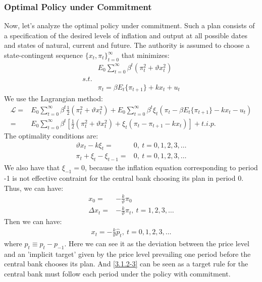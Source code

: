 \documentclass{article}
\numberwithin{equation}{section}
\begin{document}
\subsubsection{Optimal Policy under Commitment}
Now, let's analyze the optimal policy under commitment. Such a plan consists of a specification of the desired levels of inflation and output at all possible dates and states of natural, current and future. The authority is assumed to choose a state-contingent sequence $\{ x_t, \pi_t \}^\infty_{t=0}$ that minimizes:
	\begin{align*}
		&E_0 \sum\limits^\infty_{t=0} \beta^t(\pi^2_t + \vartheta x^2_t)\\
		s.t.&\\
		&\pi_t = \beta E_t\{ \pi_{t+1} \} + kx_t + u_t
	\end{align*}
We use the Lagrangian method:
	\begin{align*}
		\mathscr{L} = &E_0 \sum\limits^\infty_{t=0} \beta^t \frac{1}{2} (\pi^2_t + \vartheta x^2_t) +  E_0 \sum\limits^\infty_{t=0} \beta^t \xi_t (\pi_t - \beta E_t\{ \pi_{t+1} \} - kx_t - u_t)\\
		= &E_0 \sum\limits^\infty_{t=0} \beta^t \left[ \frac{1}{2} (\pi^2_t + \vartheta x^2_t) + \xi_t (\pi_t - \pi_{t+1} - kx_t) \right] + t.i.p.
	\end{align*}
The optimality conditions are:
	\begin{align*}
		\vartheta x_t - k\xi_t = &0,\ t = 0, 1, 2, 3, \ldots\\
		\pi_t + \xi_t - \xi_{t-1} = &0,\ t = 0, 1, 2, 3, \ldots
	\end{align*}
We also have that $	\xi_{-1} = 0$, because the inflation equation corresponding to period -1 is not effective contraint for the central bank choosing its plan in period 0.\\
Thus, we can have:
	\begin{align}
		x_0 = &-\frac{k}{\vartheta}\pi_0 \label{3.1.2-1}\\
		\Delta x_t = &-\frac{k}{\vartheta}\pi_t,\ t = 1, 2, 3, \ldots \label{3.1.2-2}
	\end{align}
Then we can have:
	\begin{align}
		x_t = -\frac{k}{\vartheta}\hat{p}_t,\ t = 0, 1, 2, 3, \ldots \label{3.1.2-3}
	\end{align}
where $\hat{p}_t \equiv p_t - p_{-1}$. Here we can see it as the deviation between the price level and an 'implicit target' given by the price level prevailing one period before the central bank chooses its plan. And \eqref{3.1.2-3} can be seen as a target rule for the central bank must follow each period under the policy with commitment.\\\\
\end{document}
